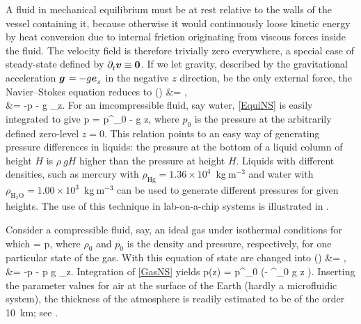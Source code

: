 A fluid in mechanical equilibrium must be at rest relative to the
walls of the vessel containing it, because otherwise it would
continuously loose kinetic energy by heat conversion due to
internal friction originating from viscous forces inside the
fluid. The velocity field is therefore trivially zero everywhere,
a special case of steady-state
defined by $\partial^{{}}_t\bm{v} \equiv \bm{0}$. If we let gravity, described
by the gravitational acceleration $\bm{g}^{{}_{}} = -g \bm{e}^{{}_{}}_z$ in the
negative $z$ direction, be the only external force, the
Navier--Stokes equation reduces to
%
 \bsubal
 \vvv(\rrr) &= ,\\
  &= -\nablabf p - \rho\:g \een_z.
 \esubal
%
For an imcompressible fluid, say water, \eqref{EquiNS} is easily
integrated to give
%
 p = p^{{}}_0 - \rho\:g z,
 \eeq
%
where $p^{{}}_0$ is the pressure at the arbitrarily defined
zero-level $z=0$. This relation points to an easy way of
generating pressure differences in liquids: the pressure at the
bottom of a liquid column of height $H$ is $\rho\:g H$ higher than
the pressure at height $H$. Liquids with different densities, such
as mercury with $\rho^{{}}_\textrm{Hg} =
1.36\times10^4$~kg$\:$m$^{-3}$ and water with
$\rho^{{}}_\textrm{H$_2$O} = 1.00 \times 10^3$~kg$\:$m$^{-3}$ can
be used to generate different pressures for given heights. The use
of this technique in lab-on-a-chip systems is illustrated in
.



Consider a compressible fluid, say, an ideal gas under isothermal
conditions for which
%
 \rho = \:p,
 \eeq
%
where $\rho^{{}}_0$ and $p^{{}}_0$ is the density and pressure,
respectively, for one particular state of the gas. With this
equation of state  are changed into
%
 \bsubal
 \vvv(\rrr) &= ,\\
  &= -\nablabf p -
 \:p g \een_z.
 \esubal
%
Integration of \eqref{GasNS} yields
%
 p(z) = p^{{}}_0\:
 \exp\Big(-\: \rho^{{}}_0 g z \Big).
 \eeq
%
Inserting the parameter values for air at the surface of the Earth
(hardly a microfluidic system), the thickness of the atmosphere is
readily estimated to be of the order 10~km; see
.


